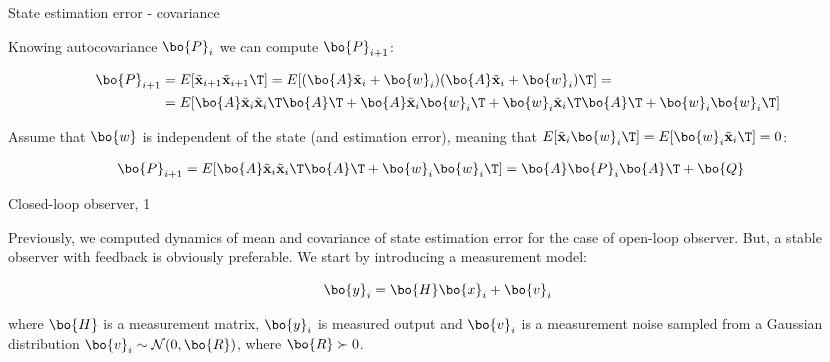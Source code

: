 \documentclass{beamer}
\newcommand{\btil}[1] {\Tilde{\mathbf{#1}}}
\begin{document}
\begin{frame}{State estimation error - covariance}
	\begin{flushleft}
		
		Knowing autocovariance $\bo{P}_i$ we can compute $\bo{P}_{i+1}$:
		
		\begin{align*}
			\bo{P}_{i+1} &= E[\btil{x}_{i+1}\btil{x}_{i+1}\T] = 
			E[(\bo{A} \btil{x}_i + \bo{w}_i) (\bo{A} \btil{x}_i + \bo{w}_i)\T] = 
			\\
			&=
			E[\bo{A} \btil{x}_i \btil{x}_i\T \bo{A}\T +
			\bo{A} \btil{x}_i \bo{w}_i\T + 
			\bo{w}_i \btil{x}_i\T \bo{A}\T +
			\bo{w}_i \bo{w}_i\T]
		\end{align*}
		
		Assume that $\bo{w}$ is independent of the state (and estimation error), meaning that $E[\btil{x}_i \bo{w}_i\T] = E[\bo{w}_i \btil{x}_i\T] = 0$:
		
		\begin{align*}
			\bo{P}_{i+1} 
			&=
			E[\bo{A} \btil{x}_i \btil{x}_i\T \bo{A}\T +
			\bo{w}_i \bo{w}_i\T] 
			= 
			\bo{A} \bo{P}_i \bo{A}\T +
			\bo{Q}
		\end{align*}
		
		
	\end{flushleft}
\end{frame}



\begin{frame}{Closed-loop observer, 1}
	\begin{flushleft}
		
		Previously, we computed dynamics of mean and covariance of state estimation error for the case of open-loop observer. But, a stable observer with feedback is obviously preferable. We start by introducing a measurement model:
		
		\begin{equation}
			\bo{y}_i = \bo{H} \bo{x}_i + \bo{v}_i
		\end{equation}
		
		where $\bo{H}$ is a measurement matrix, $\bo{y}_i$ is measured output and $\bo{v}_i$ is a measurement noise sampled from a Gaussian distribution $\bo{v}_i \sim \mathcal{N} (0, \bo{R})$, where $\bo{R} \succ 0$.
		
	\end{flushleft}
\end{frame}
\end{document}
